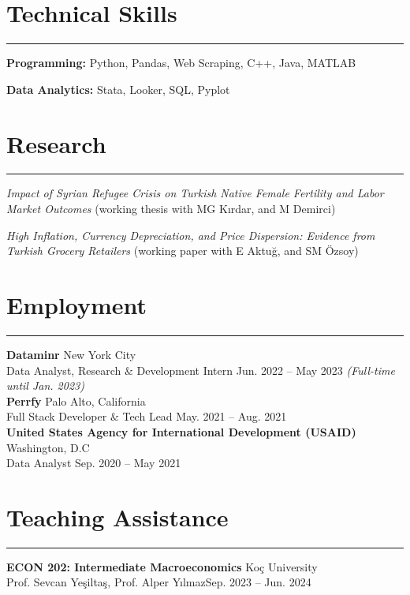 \documentclass[a4paper,10pt]{article}
\newcommand{\HRule}{\rule{\linewidth}{0.5mm}}
\begin{document}
\section*{Technical Skills}
\vspace{-15pt}
\HRule

\textbf{Programming:} Python, Pandas, Web Scraping, C++, Java, MATLAB 

\textbf{Data Analytics:} Stata, Looker, SQL, Pyplot


\section*{Research}
\vspace{-15pt}
\HRule

\emph{Impact of Syrian Refugee Crisis on Turkish Native Female Fertility and Labor Market Outcomes}
(working thesis with MG Kırdar, and M Demirci)

\emph{High Inflation, Currency Depreciation, and Price Dispersion: Evidence 
from Turkish Grocery Retailers} (working paper with E Aktuğ, and SM Özsoy)


\section*{Employment}
\vspace{-15pt}
\HRule

\textbf{Dataminr} \hfill New York City\\
Data Analyst, Research $\&$ Development Intern \hfill Jun. 2022 – May 2023 \emph{(Full-time until Jan. 2023)}\\[5pt]
\vspace{-0.5pt}
\textbf{Perrfy} \hfill Palo Alto, California\\
Full Stack Developer $\&$ Tech Lead \hfill May. 2021 – Aug. 2021 \\[5pt]
\vspace{-0.5pt}
\textbf{United States Agency for International Development (USAID)} \hfill Washington, D.C\\
Data Analyst \hfill Sep. 2020 – May 2021 

\section*{Teaching Assistance}
\vspace{-15pt}
\HRule

\textbf{ECON 202: Intermediate Macroeconomics} \hfill Koç University\\
 Prof. Sevcan Yeşiltaş, Prof. Alper Yılmaz\hfill Sep. 2023 – Jun. 2024 \\[5pt]
\end{document}
